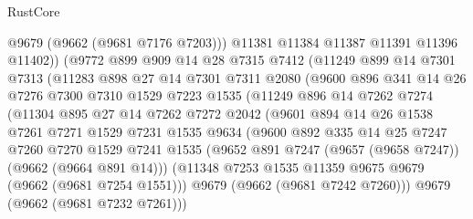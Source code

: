 \begin{lexlean}{RustCore}
\begin{coremodule}
                      @9679
                      (@9662 (@9681 @7176 @7203)))
                    @11381
                    @11384
                    @11387
                    @11391
                    @11396
                    @11402))
                (@9772
                  @899
                  @909
                  @14
                  @28
                  @7315
                  @7412
                  (@11249
                    @899
                    @14
                    @7301
                    @7313
                    (@11283
                      @898
                      @27
                      @14
                      @7301
                      @7311
                      @2080
                      (@9600
                        @896
                        @341
                        @14
                        @26
                        @7276
                        @7300
                        @7310
                        @1529
                        @7223
                        @1535
                        (@11249
                          @896
                          @14
                          @7262
                          @7274
                          (@11304
                            @895
                            @27
                            @14
                            @7262
                            @7272
                            @2042
                            (@9601
                              @894
                              @14
                              @26
                              @1538
                              @7261
                              @7271
                              @1529
                              @7231
                              @1535
                              @9634
                              (@9600
                                @892
                                @335
                                @14
                                @25
                                @7247
                                @7260
                                @7270
                                @1529
                                @7241
                                @1535
                                (@9652 @891 @7247 (@9657 (@9658 @7247)) (@9662 (@9664 @891 @14)))
                                (@11348 @7253 @1535 @11359 @9675 @9679 (@9662 (@9681 @7254 @1551)))
                                @9679
                                (@9662 (@9681 @7242 @7260)))
                              @9679
                              (@9662 (@9681 @7232 @7261)))

\end{coremodule}
\end{lexlean}
